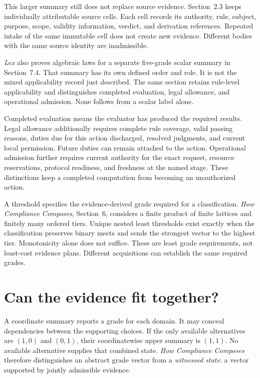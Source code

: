 \documentclass{momentum}
\begin{document}
This larger summary still does not replace source evidence. Section~2.3 keeps individually attributable source cells. Each cell records its authority, rule, subject, purpose, scope, validity information, verdict, and derivation references. Repeated intake of the same immutable cell does not create new evidence. Different bodies with the same source identity are inadmissible. \cite[Definition~2.5 and Proposition~2.6]{composes}

\emph{Lex} also proves algebraic laws for a separate five-grade scalar summary in Section~7.4. That summary has its own defined order and role. It is not the mixed applicability record just described. The same section retains rule-level applicability and distinguishes completed evaluation, legal allowance, and operational admission. None follows from a scalar label alone.

Completed evaluation means the evaluator has produced the required results. Legal allowance additionally requires complete rule coverage, valid passing reasons, duties due for this action discharged, resolved judgments, and current local permission. Future duties can remain attached to the action. Operational admission further requires current authority for the exact request, resource reservations, protocol readiness, and freshness at the named stage. These distinctions keep a completed computation from becoming an unauthorized action. \cite[Section~7.4]{lex}

A threshold specifies the evidence-derived grade required for a classification. \emph{How Compliance Composes}, Section~6, considers a finite product of finite lattices and finitely many ordered tiers. Unique nested least thresholds exist exactly when the classification preserves binary meets and sends the strongest vector to the highest tier. Monotonicity alone does not suffice. These are least grade requirements, not least-cost evidence plans. Different acquisitions can establish the same required grades. \cite[Section~6, Classification of tier maps]{composes}

\section{Can the evidence fit together?}

A coordinate summary reports a grade for each domain. It may conceal dependencies between the supporting choices. If the only available alternatives are $(1,0)$ and $(0,1)$, their coordinatewise upper summary is $(1,1)$. No available alternative supplies that combined state. \emph{How Compliance Composes} therefore distinguishes an abstract grade vector from a \emph{witnessed state}: a vector supported by jointly admissible evidence. \cite[Section~3.3]{composes}
\end{document}
